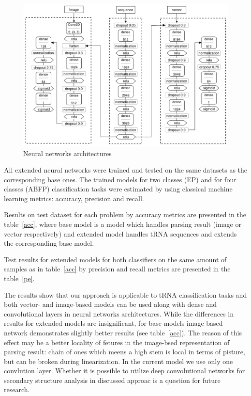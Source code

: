 \documentclass[12pt,a4paper]{cibb}
\begin{document}
\begin{figure}[h]
\begin{center}
\centering
\includegraphics[width=14cm]{nn_arch.pdf}
\caption{Neural networks architectures}
\label{nn}
\end{center}
\end{figure}


All extended neural networks were trained and tested on the same datasets as the corresponding base ones. The trained models for two classes (EP) and for four classes (ABFP) classification tasks were estimated by using classical machine learning metrics: accuracy, precision and recall.

Results on test dataset for each problem by accuracy metrics are presented in the table~\ref{acc}, where base model is a model which handles parsing result (image or vector respectively) and extended model handles tRNA sequences and extends the corresponding base model.



Test results for extended models for both classifiers on the same amount of samples as in table~\ref{acc} by precision and recall metrics are presented in the table~\ref{pe}.



The results show that our approach is applicable to tRNA classification tasks and both vector- and image-based models can be used along with dense and convolutional layers in neural networks architectures.
While the differences in results for extended models are insignificant, for base models image-based network demonstrates slightly better results (see table~\ref{acc}).
The reason of this effect may be a better locality of fetures in the image-bsed representation of parsing result: chain of ones which meens a high stem is local in terms of pisture, but can be broken during linearization.
In the current model we use only one convlution layer.
Whether it is possible to utilize deep convolutional networks for secondary structure analysis in discussed approac is a question for future research.
\end{document}
